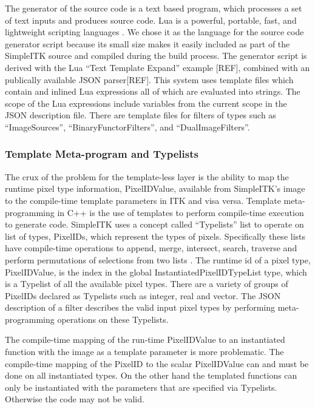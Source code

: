 \documentclass{frontiersMED} %
\begin{document}
The generator of the source code is a text based program, which
processes a set of text inputs and produces source code. Lua is a
powerful, portable, fast, and lightweight scripting languages
\cite{Ierusalimschy2006}. We chose it as the language for the source code
generator script because its small size makes it easily included as
part of the SimpleITK source and compiled during the build
process. The generator script is derived with the Lua “Text Template
Expand” example [REF], combined with an publically available JSON
parser[REF]. This system uses template files which contain and inlined
Lua expressions all of which are evaluated into strings. The scope of
the Lua expressions include variables from the current scope in the
JSON description file. There are template files for filters of types
such as “ImageSources”, “BinaryFunctorFilters”, and
“DualImageFilters”.

\subsubsection{Template Meta-program and Typelists}
The crux of the problem for the template-less layer is the ability to
map the runtime pixel type information, PixelIDValue, available from
SimpleITK’s image to the compile-time template parameters in ITK and
visa versa. Template meta-programming in C++ is the use of templates
to perform compile-time execution to generate code. SimpleITK uses a
concept called “Typelists” list to operate on list of types, PixelIDs,
which represent the types of pixels. Specifically these lists have
compile-time operations to append, merge, intersect, search, traverse
and perform permutations of selections from two lists
\cite{Alexandrescu2001}. The runtime id of a pixel type, PixelIDValue, is
the index in the global InstantiatedPixelIDTypeList type, which is a
Typelist of all the available pixel types. There are a variety of
groups of PixelIDs declared as Typelists such as integer, real and
vector. The JSON description of a filter describes the valid input
pixel types by performing meta-programming operations on these
Typelists.

The compile-time mapping of the run-time PixelIDValue to an
instantiated function with the image as a template parameter is more
problematic. The compile-time mapping of the PixelID to the scalar
PixelIDValue can and must be done on all instantiated types. On the
other hand the templated functions can only be instantiated with the
parameters that are specified via Typelists. Otherwise the code may
not be valid.
\end{document}

